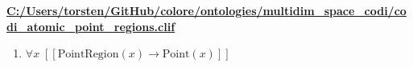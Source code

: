 \documentclass{article}
\begin{document}
\textbf{\url{C:/Users/torsten/GitHub/colore/ontologies/multidim\_space\_codi/codi\_atomic\_point\_regions.clif}}

\begin{enumerate}
\item $\forall x\;  \left[ \left[ \textrm{PointRegion}(x) \rightarrow \textrm{Point}(x) \right] \right]$
\end{enumerate}
\end{document}
